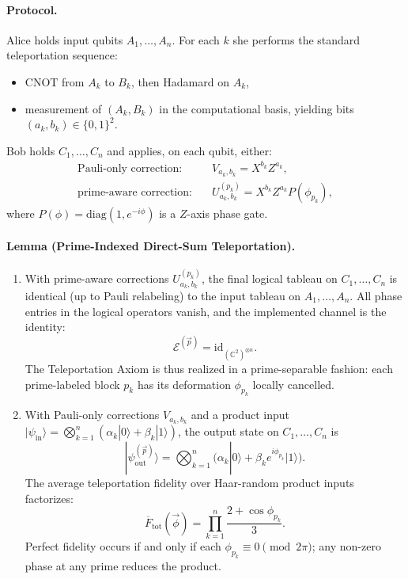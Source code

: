 \documentclass[11pt]{article}
\begin{document}
\paragraph{Protocol.} Alice holds input qubits $A_1,\dots,A_n$. For each $k$ she performs the standard teleportation sequence:
\begin{itemize}
  \item CNOT from $A_k$ to $B_k$, then Hadamard on $A_k$,
  \item measurement of $(A_k,B_k)$ in the computational basis, yielding bits $(a_k,b_k)\in\{0,1\}^2$.
\end{itemize}
Bob holds $C_1,\dots,C_n$ and applies, on each qubit, either:
\begin{align*}
\text{Pauli-only correction:} \quad & V_{a_k,b_k} = X^{b_k} Z^{a_k},\\
\text{prime-aware correction:} \quad & U^{(p_k)}_{a_k,b_k} = X^{b_k} Z^{a_k} P(\phi_{p_k}),
\end{align*}
where $P(\phi) = \mathrm{diag}(1,e^{-i\phi})$ is a $Z$-axis phase gate.

\paragraph{Lemma (Prime-Indexed Direct-Sum Teleportation).}

\begin{enumerate}
\item With prime-aware corrections $U^{(p_k)}_{a_k,b_k}$, the final logical tableau on $C_1,\dots,C_n$ is identical (up to Pauli relabeling) to the input tableau on $A_1,\dots,A_n$. All phase entries in the logical operators vanish, and the implemented channel is the identity:
\[
\mathcal{E}^{(\vec p)} = \mathrm{id}_{(\mathbb{C}^2)^{\otimes n}}.
\]
The Teleportation Axiom is thus realized in a prime-separable fashion: each prime-labeled block $p_k$ has its deformation $\phi_{p_k}$ locally cancelled.

\item With Pauli-only corrections $V_{a_k,b_k}$ and a product input $|\psi_{\mathrm{in}}\rangle = \bigotimes_{k=1}^n (\alpha_k|0\rangle+\beta_k|1\rangle)$, the output state on $C_1,\dots,C_n$ is
\[
|\psi_{\mathrm{out}}^{(\vec p)}\rangle
= \bigotimes_{k=1}^n \bigl(\alpha_k |0\rangle + \beta_k e^{i\phi_{p_k}} |1\rangle\bigr).
\]
The average teleportation fidelity over Haar-random product inputs factorizes:
\[
\overline{F}_{\mathrm{tot}}(\vec\phi)
= \prod_{k=1}^n \frac{2+\cos\phi_{p_k}}{3}.
\]
Perfect fidelity occurs if and only if each $\phi_{p_k}\equiv 0 \pmod{2\pi}$; any non-zero phase at any prime reduces the product.
\end{enumerate}
\end{document}
